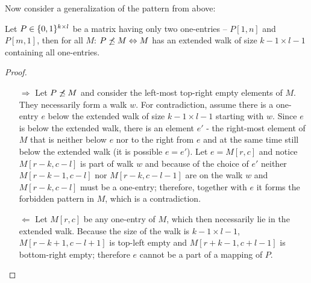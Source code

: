 Now consider a generalization of the pattern from above:
\begin{thm}
Let $P\in\{0,1\}^{k\times l}$ be a matrix having only two one-entries -- $P[1,n]$ and $P[m,1]$, then for all $M$: $P\not\preceq M\Leftrightarrow M$ has an extended walk of size $k-1\times l-1$ containing all one-entries.
\end{thm}
\begin{proof}
\begin{itemize}
\item[$\Rightarrow$] Let $P\not\preceq M$ and consider the left-most top-right empty elements of $M$. They necessarily form a walk $w$. For contradiction, assume there is a one-entry $e$ below the extended walk of size $k-1\times l-1$ starting with $w$. Since $e$ is below the extended walk, there is an element $e'$ - the right-most element of $M$ that is neither below $e$ nor to the right from $e$ and at the same time still below the extended walk (it is possible $e=e'$). Let $e=M[r,c]$ and notice $M[r-k,c-l]$ is part of walk $w$ and because of the choice of $e'$ neither $M[r-k-1,c-l]$ nor $M[r-k,c-l-1]$ are on the walk $w$ and $M[r-k,c-l]$ must be a one-entry; therefore, together with $e$ it forms the forbidden pattern in $M$, which is a contradiction.
\item[$\Leftarrow$] Let $M[r,c]$ be any one-entry of $M$, which then necessarily lie in the extended walk. Because the size of the walk is $k-1\times l-1$, $M[r-k+1,c-l+1]$ is top-left empty and $M[r+k-1,c+l-1]$ is bottom-right empty; therefore $e$ cannot be a part of a mapping of $P$. 
\end{itemize}
\end{proof}

